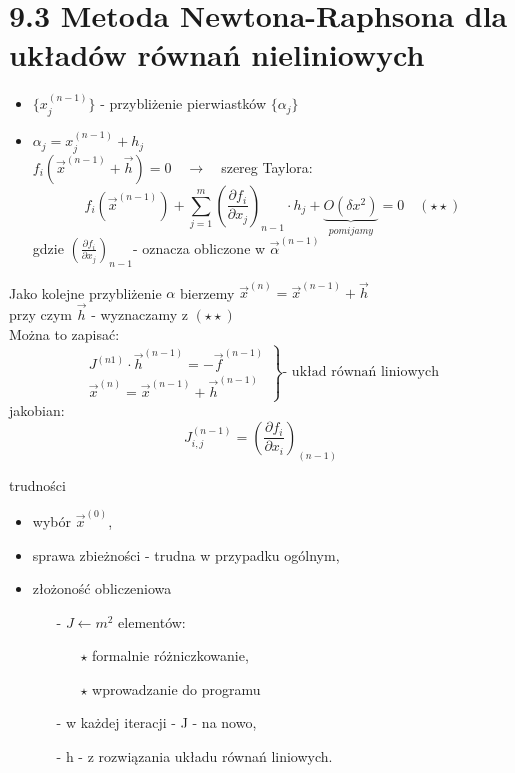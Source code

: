 \section{9.3 Metoda Newtona-Raphsona dla układów równań nieliniowych}

\begin{frame}{}
  \begin{itemize}
    \item $\{x_j^{(n-1)}\}$ - przybliżenie pierwiastków $\{\alpha_j\}$
    \item $\alpha_j=x_j^{(n-1)}+h_j$\\
    $f_i(\overrightarrow{x}^{(n-1)}+\overrightarrow{h})=0\quad\rightarrow\quad$szereg Taylora:
    $$f_i(\overrightarrow{x}^{(n-1)})+\sum_{j=1}^{m}(\frac{\partial f_i}{\partial x_j})_{n-1} \cdot h_j+\underbrace{O(\delta x^2)}_{pomijamy}=0\quad(\star\star)$$
    gdzie $(\frac{\partial f_i}{\partial x_j})_{n-1}$- oznacza obliczone w $\overrightarrow{\alpha}^{(n-1)}$
  \end{itemize}
\end{frame}

\begin{frame}{}
  Jako kolejne przybliżenie $\alpha$ bierzemy $\overrightarrow{x}^{(n)}=\overrightarrow{x}^{(n-1)}+\overrightarrow{h}$\\
  przy czym $\overrightarrow{h}$ - wyznaczamy z $(\star\star)$\\
  Można to zapisać:
 $$
 \left.
 \begin{array}{lr}
 J^{(n1)} \cdot \overrightarrow{h}^{(n-1)} = -\overrightarrow{f}^{(n-1)}\\
 \overrightarrow{x}^{(n)} = \overrightarrow{x}^{(n-1)}+\overrightarrow{h}^{(n-1)}
 \end{array}\right\}
 \text{- układ równań liniowych}
 $$
  jakobian:
  $$J^{(n-1)}_{i,j}=(\frac{\partial f_i}{\partial x_i})_{(n-1)}$$
\end{frame}

\begin{frame}{}
  \begin{block}{trudności}
    \begin{itemize}
      \item wybór $\overrightarrow{x}^{(0)}$,
      \item sprawa zbieżności - trudna w przypadku ogólnym,
      \item złożoność obliczeniowa
      \begin{itemize}
        \item[-] $J\leftarrow m^2$ elementów:
        \begin{itemize}
          \item[$\star$] formalnie różniczkowanie,
          \item[$\star$] wprowadzanie do programu
        \end{itemize}
        \item[-] w każdej iteracji - J - na nowo,
        \item[-] h - z rozwiązania układu równań liniowych.
      \end{itemize}
    \end{itemize}
  \end{block}
\end{frame}

